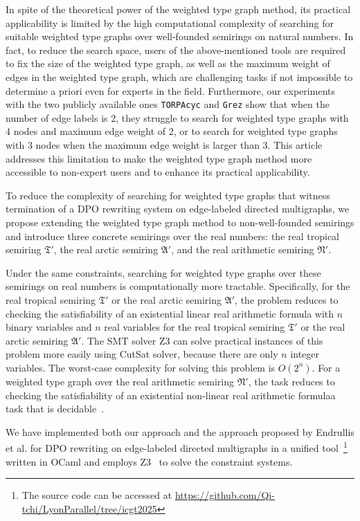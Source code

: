     In spite of the theoretical power of the weighted type graph method, its practical applicability is limited by the high computational complexity of searching for suitable weighted type graphs over well-founded semirings on 
    natural numbers. In fact, to reduce the search space, users of the above-mentioned tools are required
     to fix the size of the weighted type graph, as well as the maximum weight of edges in the weighted type graph, which are challenging tasks if not impossible to determine a priori even for experts in the field. 
    Furthermore, our experiments with the two publicly available ones \texttt{TORPAcyc} and \texttt{Grez} show that when the number of edge labels is 2, they struggle to search for weighted type graphs with 4 nodes and maximum edge weight of 2, or to search for weighted type graphs with 3 nodes when the maximum edge weight is larger than 3. 
    This article addresses this limitation to make the weighted type graph method more accessible to non-expert users and to enhance its practical applicability.

To reduce the complexity of searching for weighted type graphs that witness termination of a DPO rewriting system on edge-labeled directed multigraphs, we propose extending the weighted type graph method to non-well-founded semirings and introduce three concrete semirings over the real numbers: the real tropical semiring $\mathfrak{T}'$, the real arctic semiring $\mathfrak{A}'$, and the real arithmetic semiring $\mathfrak{N}'$. 


Under the same constraints, searching for weighted type graphs over these semirings on real numbers is computationally more tractable. Specifically,
for the real tropical semiring $\mathfrak{T}'$ or the real arctic semiring $\mathfrak{A}'$, the problem reduces 
to checking the satisfiability of an 
existential linear real arithmetic formula with $n$ binary variables and $n$ real variables for the real tropical semiring $\mathfrak{T}'$ or the real arctic semiring $\mathfrak{A}'$. 
The SMT solver Z3 can solve practical instances of this problem more easily using CutSat solver, because there are only $n$ integer variables. The worst-case complexity for solving this problem is $O(2^n)$.
For a weighted type graph over the real arithmetic semiring $\mathfrak{N}'$, the task reduces to checking the satisfiability of 
an existential non-linear real arithmetic formula\textemdash a task that is decidable~\cite{collins1974quantifier,z3realarithmetic}.


We have implemented both our approach and the approach proposed by Endrullis et al. \cite{endrullis2024generalized_arxiv_v2} for DPO rewriting on edge-labeled directed multigraphs in a unified tool~\footnote{The source code can be accessed at \url{https://github.com/Qi-tchi/LyonParallel/tree/icgt2025}} written in OCaml and employs Z3~\cite{de2008z3} to solve the constraint systems.

